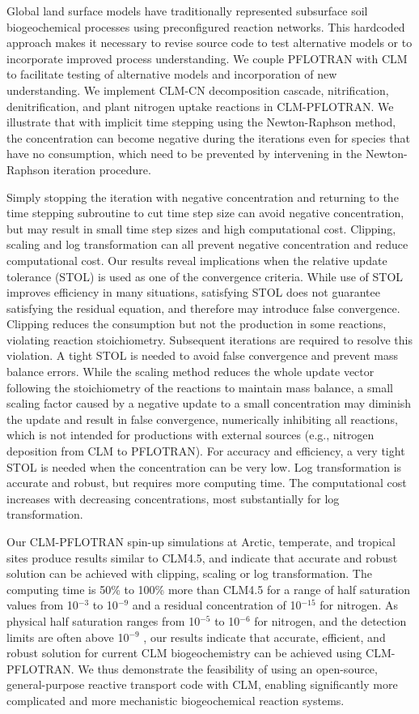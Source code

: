\documentclass[gmd, manuscript]{copernicus}
\begin{document}
%
Global land surface models have traditionally represented subsurface soil
biogeochemical processes using preconfigured reaction networks. This hardcoded
approach makes it necessary to revise source code to test alternative models or
to incorporate improved process understanding. We couple PFLOTRAN with CLM to
facilitate testing of alternative models and incorporation of new
understanding. We implement CLM-CN decomposition cascade, nitrification,
denitrification, and plant nitrogen uptake reactions in CLM-PFLOTRAN. We
illustrate that with implicit time stepping using the Newton-Raphson method, 
the concentration can become
negative during the iterations even for species that have no consumption, which
need to be prevented by intervening in the Newton-Raphson iteration procedure. 

Simply stopping the iteration with negative concentration and returning to the
time stepping subroutine to cut time step size can avoid negative
concentration, but may result in small time step sizes and high computational
cost. Clipping, scaling  and log transformation can all prevent negative
concentration and reduce computational cost. Our results reveal implications
when the relative update tolerance (STOL) is used as one of the convergence criteria. 
While use of STOL improves efficiency in many situations, satisfying STOL does
not guarantee satisfying the residual equation, and therefore may introduce
false convergence. Clipping reduces the consumption but not the production in
some reactions, violating reaction stoichiometry. Subsequent iterations are
required to resolve this violation. A tight STOL is needed to avoid false
convergence and prevent mass balance errors. While the scaling method reduces
the whole update vector following the stoichiometry of the reactions to maintain  
mass balance, a small scaling factor caused by a negative update to a small
concentration may diminish the update and result in false convergence,
numerically inhibiting all reactions, which is not intended for productions
with external sources (e.g., nitrogen deposition from CLM to PFLOTRAN). For
accuracy and efficiency, a very tight STOL is needed when the concentration can
be very low. Log transformation is accurate and robust, but requires more
computing time. The computational cost increases with decreasing
concentrations, most substantially for log transformation.

Our CLM-PFLOTRAN spin-up simulations at Arctic, temperate, and tropical sites
produce results similar to CLM4.5, and indicate that accurate and robust
solution can be achieved with clipping, scaling or log transformation. The
computing time is 50\% to 100\% more than CLM4.5 for a range of half
saturation values from 10$^{-3}$ to 10$^{-9}$ and a residual concentration of
10$^{-15}$ for nitrogen. As physical half saturation ranges from 10$^{-5}$ to
10$^{-6}$  for nitrogen, and the detection limits are often above
10$^{-9}$ , our results indicate that accurate, efficient, and robust
solution  for current CLM biogeochemistry can be achieved using CLM-PFLOTRAN.
We thus demonstrate the feasibility of using an open-source, general-purpose
reactive transport code with CLM, enabling significantly more complicated and
more mechanistic biogeochemical reaction systems. 
 
\end{document}
